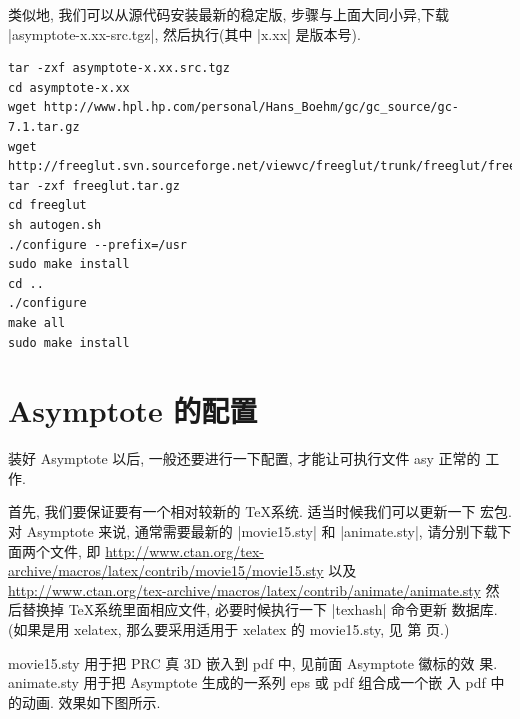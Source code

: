 \documentclass[nofonts,CJKnormalspaces]{ctexbook}[2009/05/20]
\begin{document}
类似地, 我们可以从源代码安装最新的稳定版, 步骤与上面大同小异,下载
|asymptote-x.xx-src.tgz|, 然后执行(其中 |x.xx| 是版本号).
\begin{verbatim}
tar -zxf asymptote-x.xx.src.tgz
cd asymptote-x.xx
wget http://www.hpl.hp.com/personal/Hans_Boehm/gc/gc_source/gc-7.1.tar.gz
wget http://freeglut.svn.sourceforge.net/viewvc/freeglut/trunk/freeglut/freeglut.tar.gz
tar -zxf freeglut.tar.gz
cd freeglut
sh autogen.sh
./configure --prefix=/usr
sudo make install
cd ..
./configure
make all
sudo make install
\end{verbatim}

\section{Asymptote 的配置}
装好 Asymptote 以后, 一般还要进行一下配置, 才能让可执行文件 asy 正常的
工作.\label{asy:Settings}

首先, 我们要保证要有一个相对较新的 \TeX 系统. 适当时候我们可以更新一下
宏包. 对 Asymptote 来说, 通常需要最新的 |movie15.sty| 和 |animate.sty|,
请分别下载下面两个文件, 即
\url{http://www.ctan.org/tex-archive/macros/latex/contrib/movie15/movie15.sty}
以及
\url{http://www.ctan.org/tex-archive/macros/latex/contrib/animate/animate.sty}
然后替换掉 \TeX 系统里面相应文件, 必要时候执行一下 |texhash| 命令更新
数据库.(如果是用 xelatex, 那么要采用适用于 xelatex 的 movie15.sty, 见
第 \pageref{movie15:xelatex} 页.)

movie15.sty 用于把 PRC 真 3D 嵌入到 pdf 中, 见前面 Asymptote 徽标的效
果. animate.sty 用于把 Asymptote 生成的一系列 eps 或 pdf 组合成一个嵌
入 pdf 中的动画. 效果如下图所示.
\end{document}

